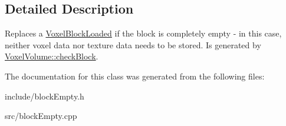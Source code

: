 \subsection{\-Detailed \-Description}
\-Replaces a \hyperlink{classVoxelBlockLoaded}{\-Voxel\-Block\-Loaded} if the block is completely empty -\/ in this case, neither voxel data nor texture data needs to be stored. \-Is generated by \hyperlink{classVoxelVolume_a0a1e8cdc7c5c2ba73b08e3418579efce}{\-Voxel\-Volume\-::check\-Block}. 

\-The documentation for this class was generated from the following files\-:\begin{DoxyCompactItemize}
\item 
include/block\-Empty.\-h\item 
src/block\-Empty.\-cpp\end{DoxyCompactItemize}
